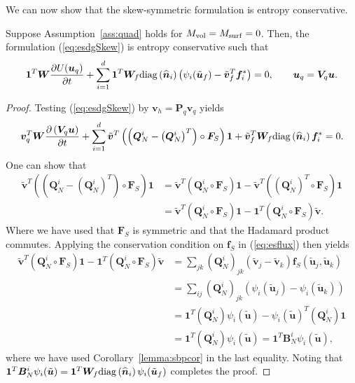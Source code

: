 \documentclass[review]{siamart0216}
\theoremstyle{assumption}
\renewcommand{\hat}[1]{\hat{#1}}
\newcommand{\pd}[2]{\frac{\partial#1}{\partial#2}}
\newcommand{\LRp}[1]{\left( #1 \right)}
\renewcommand{\hat}{\widehat}
\newcommand{\diag}[1]{{\rm diag}\LRp{#1}}
\begin{document}
We can now show that the skew-symmetric formulation is entropy conservative.  
\begin{theorem}
Suppose Assumption~\ref{ass:quad} holds for $M_{\rm vol} = M_{\rm surf} = 0$.  
Then, the formulation (\ref{eq:esdgSkew}) is entropy conservative such that
\[
\bm{1}^T\bm{W}\pd{U(\bm{u}_q)}{t} + \sum_{i=1}^d\bm{1}^T\bm{W}_f \diag{\hat{\bm{n}}_i} \LRp{\psi_i(\tilde{\bm{u}}_f) - \tilde{\bm{v}}_f^T\bm{f}_i^*} = 0, \qquad \bm{u}_q = \bm{V}_q\bm{u}.
\]
\label{thm:esdg}
\end{theorem}
\begin{proof}
Testing (\ref{eq:esdgSkew}) by $\bm{v}_h = \bm{P}_q\bm{v}_q$ yields 
\begin{align}
\bm{v}_q^T\bm{W}\pd{\LRp{\bm{V}_q\bm{u}}}{t} + \sum_{i=1}^d
\tilde{\bm{v}}^T \LRp{\LRp{\bm{Q}^i_N - \LRp{\bm{Q}^i_N}^T} \circ \bm{F}_S}\bm{1} + \tilde{\bm{v}}_f^T \bm{W}_f \diag{\hat{\bm{n}}_i}\bm{f}_i^* = 0.
\end{align}
One can show that \cite{chan2017discretely}
\begin{align*}
\tilde{\bm{v}}^T \LRp{\LRp{\bm{Q}^i_N - \LRp{\bm{Q}^i_N}^T} \circ \bm{F}_S}\bm{1} &= \tilde{\bm{v}}^T \LRp{\bm{Q}^i_N \circ \bm{F}_S}\bm{1} - \tilde{\bm{v}}^T \LRp{\LRp{\bm{Q}^i_N}^T \circ \bm{F}_S}\bm{1}\\
&= \tilde{\bm{v}}^T \LRp{\bm{Q}^i_N \circ \bm{F}_S}\bm{1} - \bm{1}^T \LRp{{\bm{Q}^i_N} \circ \bm{F}_S}\tilde{\bm{v}}.
\end{align*}
Where we have used that $\bm{F}_S$ is symmetric and that the Hadamard product commutes.  Applying the conservation condition on $\bm{f}_S$ in (\ref{eq:esflux}) then yields
\begin{align*}
\tilde{\bm{v}}^T \LRp{\bm{Q}^i_N \circ \bm{F}_S}\bm{1} - \bm{1}^T \LRp{{\bm{Q}^i_N} \circ \bm{F}_S}\tilde{\bm{v}} &= \sum_{jk} \LRp{\bm{Q}^i_N}_{jk} \LRp{\tilde{\bm{v}}_j-\tilde{\bm{v}}_k} \bm{f}_S\LRp{\tilde{\bm{u}}_j,\tilde{\bm{u}}_k} \\
&= \sum_{ij} \LRp{\bm{Q}^i_N}_{jk} \LRp{\psi_i(\tilde{\bm{u}}_j) - \psi_i(\tilde{\bm{u}}_k)}\\
&= \bm{1}^T\LRp{\bm{Q}^i_N}\psi_i(\tilde{\bm{u}}) - \psi_i(\tilde{\bm{u}})^T\LRp{\bm{Q}^i_N}\bm{1} \\
&= \bm{1}^T\LRp{\bm{Q}^i_N}\psi_i(\tilde{\bm{u}}) = \bm{1}^T\bm{B}^i_N\psi_i(\tilde{\bm{u}}),
\end{align*}
where we have used Corollary~\ref{lemma:sbpcor} in the last equality.  Noting that $\bm{1}^T\bm{B}^i_N\psi_i(\tilde{\bm{u}}) = \bm{1}^T\bm{W}_f \diag{\hat{\bm{n}}_i} \psi_i(\tilde{\bm{u}}_f)$ completes the proof.
\end{proof}
\end{document}
